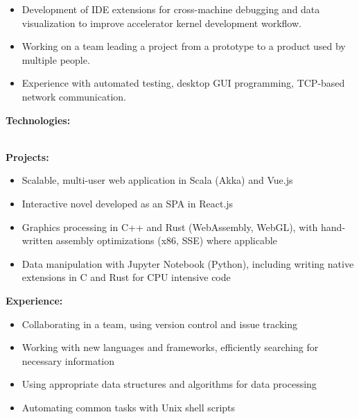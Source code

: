 \documentclass[11pt,a4paper,ragged2e]{altacv}
\begin{document}

\begin{fullwidth}
\makecvheader
\end{fullwidth}



\begin{itemize}
\item Development of IDE extensions for cross-machine debugging and data visualization
to improve accelerator kernel development workflow.
\item Working on a team leading a project from a prototype to a product used by multiple people.
\item Experience with automated testing, desktop GUI programming, TCP-based network communication.
\end{itemize}
\vspace*{1mm}
\small{\textbf{Technologies:}}\\[2mm]
\\\smallskip
{}

\medskip

\small{\textbf{Projects:}}\\[2mm]
\begin{itemize}
\item Scalable, multi-user web application in Scala (Akka) and Vue.js
\item Interactive novel developed as an SPA in React.js
\item Graphics processing in C++ and Rust (WebAssembly, WebGL), with hand-written
assembly optimizations (x86, SSE) where applicable
\item Data manipulation with Jupyter Notebook (Python), including writing
native extensions in C and Rust for CPU intensive code
\end{itemize}
\vspace*{1mm}
\small{\textbf{Experience:}}\\[2mm]
\begin{itemize}
\item Collaborating in a team, using version control and issue tracking
\item Working with new languages and frameworks, efficiently searching for necessary information
\item Using appropriate data structures and algorithms for data processing
\item Automating common tasks with Unix shell scripts
\end{itemize}
\end{document}
